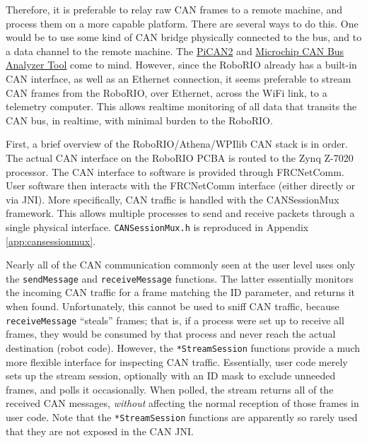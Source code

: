 \documentclass[12pt]{article}
\begin{document}
\par Therefore, it is preferable to relay raw CAN frames to a remote machine, and process them on a more capable platform. There are several ways to do this. One would be to use some kind of CAN bridge physically connected to the bus, and to a data channel to the remote machine. The \href{https://copperhilltech.com/pican-2-can-interface-for-raspberry-pi-2-3/}{PiCAN2} and \href{https://www.microchip.com/DevelopmentTools/ProductDetails/PartNO/APGDT002}{Microchip CAN Bus Analyzer Tool} come to mind. However, since the RoboRIO already has a built-in CAN interface, as well as an Ethernet connection, it seems preferable to stream CAN frames from the RoboRIO, over Ethernet, across the WiFi link, to a telemetry computer. This allows realtime monitoring of all data that transits the CAN bus, in realtime, with minimal burden to the RoboRIO. 

\par First, a brief overview of the RoboRIO/Athena/WPIlib CAN stack is in order. The actual CAN interface on the RoboRIO PCBA is routed to the Zynq Z-7020 processor. The CAN interface to software is provided through FRCNetComm. User software then interacts with the FRCNetComm interface (either directly or via JNI). More specifically, CAN traffic is handled with the CANSessionMux framework. This allows multiple processes to send and receive packets through a single physical interface. \texttt{CANSessionMux.h} is reproduced in Appendix \ref{app:cansessionmux}.

\par Nearly all of the CAN communication commonly seen at the user level uses only the \texttt{sendMessage} and \texttt{receiveMessage} functions. The latter essentially monitors the incoming CAN traffic for a frame matching the ID parameter, and returns it when found. Unfortunately, this cannot be used to sniff CAN traffic, because \texttt{receiveMessage} ``steals'' frames; that is, if a process were set up to receive all frames, they would be consumed by that process and never reach the actual destination (robot code). However, the \texttt{*StreamSession} functions provide a much more flexible interface for inspecting CAN traffic. Essentially, user code merely sets up the stream session, optionally with an ID mask to exclude unneeded frames, and polls it occasionally. When polled, the stream returns all of the received CAN messages, \textit{without} affecting the normal reception of those frames in user code. Note that the \texttt{*StreamSession} functions are apparently so rarely used that they are not exposed in the CAN JNI. 
\end{document}
